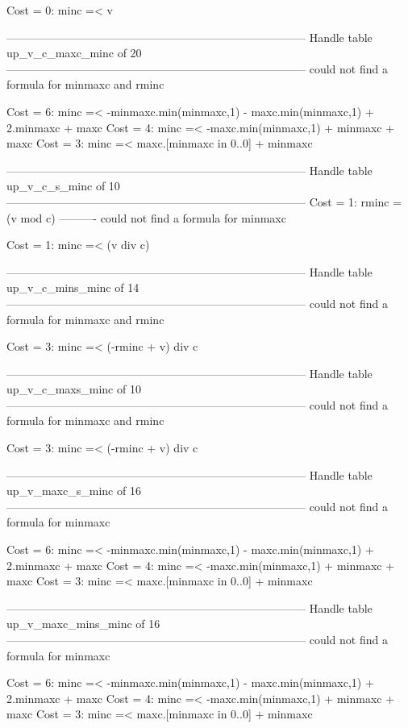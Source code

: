 Cost =  0:  minc =< v

--------------------------------------------------------------------------------
Handle table up_v_c_maxc_minc of 20
--------------------------------------------------------------------------------
could not find a formula for minmaxc and rminc

Cost =  6:  minc =< -minmaxc.min(minmaxc,1) - maxc.min(minmaxc,1) + 2.minmaxc + maxc
Cost =  4:  minc =< -maxc.min(minmaxc,1) + minmaxc + maxc
Cost =  3:  minc =< maxc.[minmaxc in 0..0] + minmaxc

--------------------------------------------------------------------------------
Handle table up_v_c_s_minc of 10
--------------------------------------------------------------------------------
Cost =  1:  rminc   = (v mod c)
----------
could not find a formula for minmaxc

Cost =  1:  minc =< (v div c)

--------------------------------------------------------------------------------
Handle table up_v_c_mins_minc of 14
--------------------------------------------------------------------------------
could not find a formula for minmaxc and rminc

Cost =  3:  minc =< (-rminc + v) div c

--------------------------------------------------------------------------------
Handle table up_v_c_maxs_minc of 10
--------------------------------------------------------------------------------
could not find a formula for minmaxc and rminc

Cost =  3:  minc =< (-rminc + v) div c

--------------------------------------------------------------------------------
Handle table up_v_maxc_s_minc of 16
--------------------------------------------------------------------------------
could not find a formula for minmaxc

Cost =  6:  minc =< -minmaxc.min(minmaxc,1) - maxc.min(minmaxc,1) + 2.minmaxc + maxc
Cost =  4:  minc =< -maxc.min(minmaxc,1) + minmaxc + maxc
Cost =  3:  minc =< maxc.[minmaxc in 0..0] + minmaxc

--------------------------------------------------------------------------------
Handle table up_v_maxc_mins_minc of 16
--------------------------------------------------------------------------------
could not find a formula for minmaxc

Cost =  6:  minc =< -minmaxc.min(minmaxc,1) - maxc.min(minmaxc,1) + 2.minmaxc + maxc
Cost =  4:  minc =< -maxc.min(minmaxc,1) + minmaxc + maxc
Cost =  3:  minc =< maxc.[minmaxc in 0..0] + minmaxc

